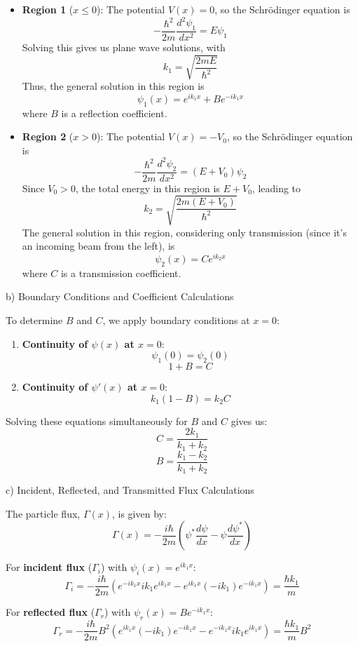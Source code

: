 \begin{itemize}
    \item \textbf{Region 1} (\(x \leq 0\)): The potential \(V(x) = 0\), so the Schrödinger equation is
    \[ -\frac{\hbar^2}{2m} \frac{d^2\psi_1}{dx^2} = E\psi_1 \]
    Solving this gives us plane wave solutions, with
    \[ k_1 = \sqrt{\frac{2mE}{\hbar^2}} \]
    Thus, the general solution in this region is
    \[ \psi_1(x) = e^{ik_1x} + Be^{-ik_1x} \]
    where \(B\) is a reflection coefficient.

    \item \textbf{Region 2} (\(x > 0\)): The potential \(V(x) = -V_0\), so the Schrödinger equation is
    \[ -\frac{\hbar^2}{2m} \frac{d^2\psi_2}{dx^2} = (E + V_0)\psi_2 \]
    Since \(V_0 > 0\), the total energy in this region is \(E + V_0\), leading to
    \[ k_2 = \sqrt{\frac{2m(E + V_0)}{\hbar^2}} \]
    The general solution in this region, considering only transmission (since it's an incoming beam from the left), is
    \[ \psi_2(x) = Ce^{ik_2x} \]
    where \(C\) is a transmission coefficient.
\end{itemize}

b) Boundary Conditions and Coefficient Calculations

To determine \(B\) and \(C\), we apply boundary conditions at \(x = 0\):

\begin{enumerate}
    \item \textbf{Continuity of \(\psi(x)\) at \(x = 0\)}:
    \[ \psi_1(0) = \psi_2(0) \]
    \[ 1 + B = C \]

    \item \textbf{Continuity of \(\psi'(x)\) at \(x = 0\)}:
    \[ k_1(1 - B) = k_2C \]
\end{enumerate}

Solving these equations simultaneously for \(B\) and \(C\) gives us:
\[ C = \frac{2k_1}{k_1 + k_2} \]
\[ B = \frac{k_1 - k_2}{k_1 + k_2} \]

c) Incident, Reflected, and Transmitted Flux Calculations

The particle flux, \(\Gamma(x)\), is given by:
\[ \Gamma(x) = -\frac{i\hbar}{2m} \left(\psi^{*}\frac{d\psi}{dx} - \psi\frac{d\psi^{*}}{dx} \right) \]

For \textbf{incident flux} (\(\Gamma_i\)) with \(\psi_i(x) = e^{ik_1x}\):
\[ \Gamma_i = -\frac{i\hbar}{2m} \left(e^{-ik_1x}ik_1e^{ik_1x} - e^{ik_1x}(-ik_1)e^{-ik_1x} \right) = \frac{\hbar k_1}{m} \]

For \textbf{reflected flux} (\(\Gamma_r\)) with \(\psi_r(x) = Be^{-ik_1x}\):
\[ \Gamma_r = -\frac{i\hbar}{2m} B^2 \left(e^{ik_1x}(-ik_1)e^{-ik_1x} - e^{-ik_1x}ik_1e^{ik_1x} \right) = \frac{\hbar k_1}{m}B^2 \]

